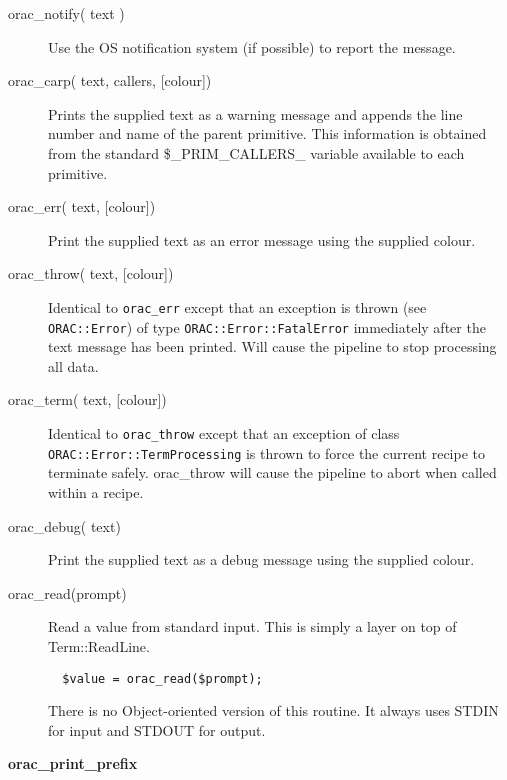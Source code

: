 \begin{description}
\begin{description}
\begin{description}
\item[{orac\_notify( text )}] \mbox{}

Use the OS notification system (if possible) to report the message.


\item[{orac\_carp( text, callers, [colour])}] \mbox{}

Prints the supplied text as a warning message and appends the line number
and name of the parent primitive. This information is obtained from the
standard \$\_PRIM\_CALLERS\_ variable available to each primitive.


\item[{orac\_err( text, [colour])}] \mbox{}

Print the supplied text as an error message using the supplied
colour.


\item[{orac\_throw( text, [colour])}] \mbox{}

Identical to \texttt{orac\_err} except that an exception is thrown (see
\texttt{ORAC::Error}) of type \texttt{ORAC::Error::FatalError} immediately after
the text message has been printed. Will cause the pipeline to stop
processing all data.


\item[{orac\_term( text, [colour])}] \mbox{}

Identical to \texttt{orac\_throw} except that an exception of class
\texttt{ORAC::Error::TermProcessing} is thrown to force the current recipe
to terminate safely. orac\_throw will cause the pipeline to abort when
called within a recipe.


\item[{orac\_debug( text)}] \mbox{}

Print the supplied text as a debug message using the supplied
colour.


\item[{orac\_read(prompt)}] \mbox{}

Read a value from standard input. This is simply a layer
on top of Term::ReadLine.

\begin{verbatim}
  $value = orac_read($prompt);
\end{verbatim}


There is no Object-oriented version of this routine. It always
uses STDIN for input and STDOUT for output.


\item[{\textbf{orac\_print\_prefix}}] \mbox{}


\end{description}
\end{description}
\end{description}
